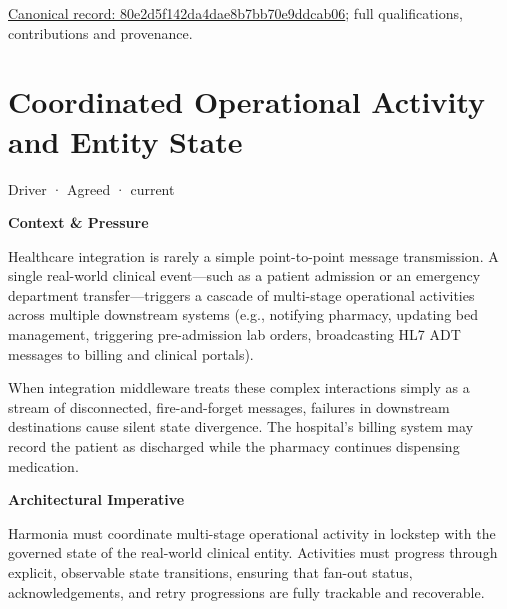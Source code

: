 {\footnotesize \href{../../../../continuum/motivation/driver/80e2d5f142da4dae8b7bb70e9ddcab06.md}{Canonical record: 80e2d5f142da4dae8b7bb70e9ddcab06}; full qualifications, contributions and provenance.}\par
\section{Coordinated Operational Activity and Entity State}

\label{element:b3fb294d95024e4382b2c251c389fa66}
{\small Driver · Agreed · current}\par

\par\medskip\textbf{Context \& Pressure}\par


Healthcare integration is rarely a simple point-to-point message transmission. A single real-world clinical event—such as a patient admission or an emergency department transfer—triggers a cascade of multi-stage operational activities across multiple downstream systems (e.g., notifying pharmacy, updating bed management, triggering pre-admission lab orders, broadcasting HL7 ADT messages to billing and clinical portals).



When integration middleware treats these complex interactions simply as a stream of disconnected, fire-and-forget messages, failures in downstream destinations cause silent state divergence. The hospital's billing system may record the patient as discharged while the pharmacy continues dispensing medication.



\par\medskip\textbf{Architectural Imperative}\par


Harmonia must coordinate multi-stage operational activity in lockstep with the governed state of the real-world clinical entity. Activities must progress through explicit, observable state transitions, ensuring that fan-out status, acknowledgements, and retry progressions are fully trackable and recoverable.



